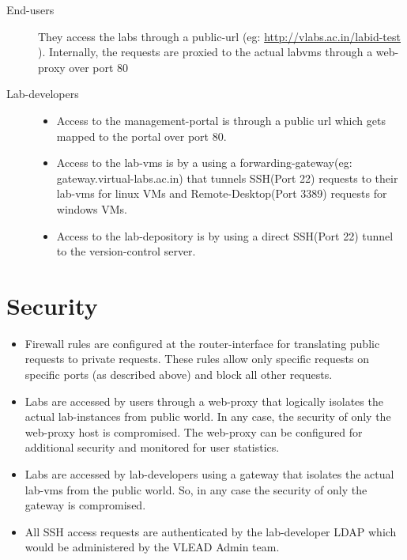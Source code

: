 \documentclass[11pt]{article}
\begin{document}
\begin{description}
\item [End-users] They access the labs through a public-url (eg:
                  \href{http://vlabs.ac.in/labid-test}{http://vlabs.ac.in/labid-test} ). Internally, the
                  requests are proxied to the actual labvms through a
                  web-proxy over port 80
\item [Lab-developers]

\begin{itemize}
\item Access to the management-portal is through a public url which
          gets mapped to the portal over port 80.
\item Access to the lab-vms is by a using a forwarding-gateway(eg:
          gateway.virtual-labs.ac.in) that tunnels SSH(Port 22)
          requests to their lab-vms for linux VMs and 
          Remote-Desktop(Port 3389) requests for windows VMs.
\item Access to the lab-depository is by using a direct SSH(Port 22)
          tunnel to the version-control server.
\end{itemize}

\end{description}
\section{Security}
\label{sec-6}


\begin{itemize}
\item Firewall rules are configured at the router-interface for
    translating public requests to private requests. These rules allow
    only specific requests on specific ports (as described above) and
    block all other requests.
\item Labs are accessed by users through a web-proxy that logically
    isolates the actual lab-instances from public world. In any case,
    the security of only the web-proxy host is compromised. The
    web-proxy can be configured for additional security and monitored
    for user statistics.
\item Labs are accessed by lab-developers using a gateway that isolates
    the actual lab-vms from the public world. So, in any case the
    security of only the gateway is compromised.
\item All SSH access requests are authenticated by the lab-developer
    LDAP which would be administered by the VLEAD Admin team.
\end{itemize}
\end{document}
